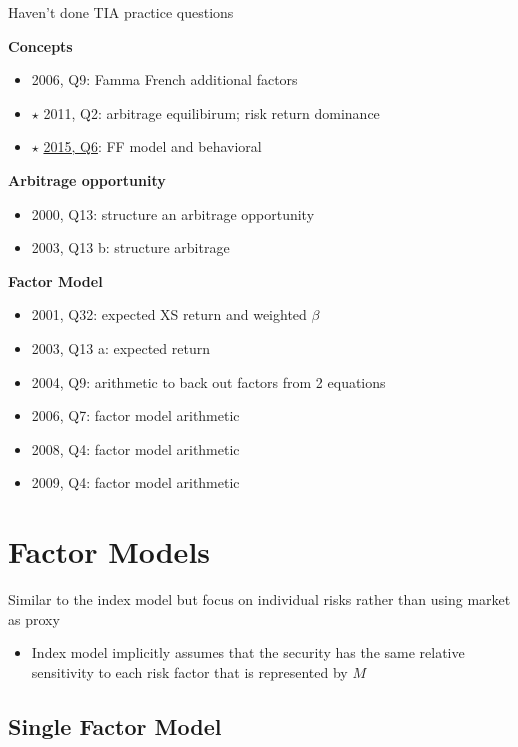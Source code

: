 \documentclass[]{book}
\providecommand{\tightlist}{%
  \setlength{\itemsep}{0pt}\setlength{\parskip}{0pt}}
\theoremstyle{definition}
\theoremstyle{definition}
\theoremstyle{remark}
\begin{document}
{Haven't done TIA practice questions}

\textbf{Concepts}

\begin{itemize}
\tightlist
\item
  2006, Q9: Famma French additional factors
\item
  \(\star\) 2011, Q2: arbitrage equilibirum; risk return dominance
\item
  \(\star\) \protect\hyperlink{2015-6}{2015, Q6}: FF model and
  behavioral
\end{itemize}

\textbf{Arbitrage opportunity}

\begin{itemize}
\tightlist
\item
  2000, Q13: structure an arbitrage opportunity
\item
  2003, Q13 b: structure arbitrage
\end{itemize}

\textbf{Factor Model}

\begin{itemize}
\tightlist
\item
  2001, Q32: expected XS return and weighted \(\beta\)
\item
  2003, Q13 a: expected return
\item
  2004, Q9: arithmetic to back out factors from 2 equations
\item
  2006, Q7: factor model arithmetic
\item
  2008, Q4: factor model arithmetic
\item
  2009, Q4: factor model arithmetic
\end{itemize}

\section{Factor Models}\label{factor-models}

Similar to the index model but focus on individual risks rather than
using market as proxy

\begin{itemize}
\tightlist
\item
  Index model implicitly assumes that the security has the same relative
  sensitivity to each risk factor that is represented by \(M\)
\end{itemize}

\subsection{Single Factor Model}\label{single-factor-model-1}
\end{document}
